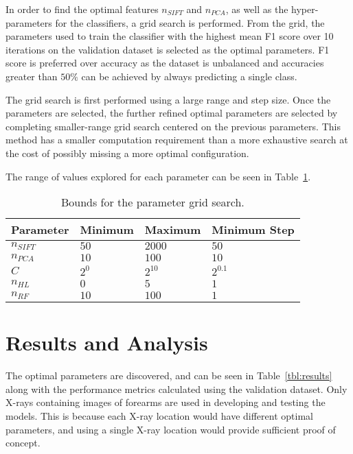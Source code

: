 \documentclass{IEEEtran}
\newcommand{\nsift}{\ensuremath{n_{SIFT}}}
\newcommand{\npca}{\ensuremath{n_{PCA}}}
\newcommand{\nhl}{\ensuremath{n_{HL}}}
\newcommand{\nrf}{\ensuremath{n_{RF}}}
\begin{document}
	In order to find the optimal features $\nsift$ and $\npca$, as well as the hyper-parameters for the classifiers, a grid search is performed. From the grid, the parameters used to train the classifier with the highest mean F1 score over 10 iterations on the validation dataset is selected as the optimal parameters. F1 score is preferred over accuracy as the dataset is unbalanced and accuracies greater than $50\%$ can be achieved by always predicting a single class. 
	
	The grid search is first performed using a large range and step size. Once the parameters are selected, the further refined optimal parameters are selected by completing smaller-range grid search centered on the previous parameters. This method has a smaller computation requirement than a more exhaustive search at the cost of possibly missing a more optimal configuration.
	
	The range of values explored for each parameter can be seen in Table~\ref{tbl:bounds}.
	
	\begin{table}[b!]
		\centering
		\caption{Bounds for the parameter grid search.}
		\label{tbl:bounds}
		\begin{tabular}{llll}
			\hline
			Parameter & Minimum & Maximum    & Minimum Step \\ \hline
			$\nsift$  & $ 50 $  & $ 2000 $   & $ 50 $       \\
			$\npca$   & $ 10 $  & $ 100 $    & $ 10 $       \\
			$C$       & $ 2^0 $ & $ 2^{10} $ & $ 2^{0.1} $  \\
			$\nhl$    & $ 0 $   & $ 5 $      & $ 1 $        \\
			$\nrf$    & $ 10 $  & $ 100 $    & $ 1 $        \\ \hline
		\end{tabular}
	\end{table}
	
	\section{Results and Analysis} \label{sec:results}
	
	The optimal parameters are discovered, and can be seen in Table~\ref{tbl:results} along with the performance metrics calculated using the validation dataset. Only X-rays containing images of forearms are used in developing and testing the models. This is because each X-ray location would have different optimal parameters, and using a single X-ray location would provide sufficient proof of concept.
	
\end{document}
